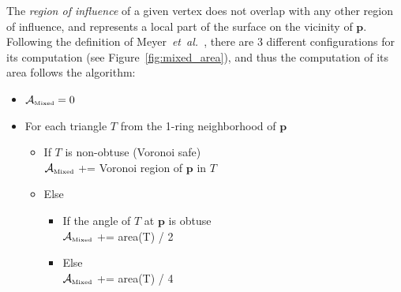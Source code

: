 \documentclass{InsightArticle}
\theoremstyle{plain}
\begin{document}
The \emph{region of influence} of a given vertex does not overlap with any other region of influence, and represents a local part of the surface on the vicinity of $\mathbf{p}$. Following the definition of Meyer~\textit{et~al.}~\cite{Meyer02}, there are 3 different configurations for its computation (see Figure~\ref{fig:mixed_area}), and thus the computation of its area follows the algorithm:
\begin{itemize}
  \item $\mathcal{A}_{\text{\tiny{Mixed}}} = 0$
  \item For each triangle $T$ from the 1-ring neighborhood of $\mathbf{p}$
    \begin{itemize}
      \item If $T$ is non-obtuse (Voronoi safe)\\
        $\mathcal{A}_{\text{\tiny{Mixed}}}$ += Voronoi region of $\mathbf{p}$ in $T$
      \item Else
        \begin{itemize}
          \item If the angle of $T$ at $\mathbf{p}$ is obtuse\\
            $\mathcal{A}_{\text{\tiny{Mixed}}}$ += area(T) / 2
          \item Else\\
            $\mathcal{A}_{\text{\tiny{Mixed}}}$ += area(T) / 4
        \end{itemize}

    \end{itemize}

\end{itemize}
\end{document}

